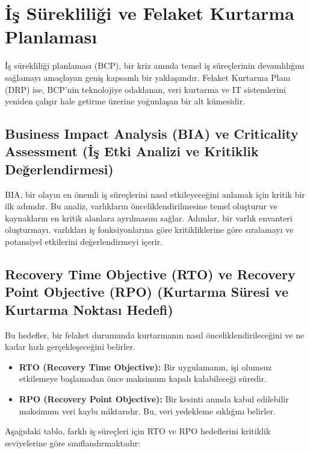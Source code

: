 \section{İş Sürekliliği ve Felaket Kurtarma Planlaması}

İş sürekliliği planlaması (BCP), bir kriz anında temel iş süreçlerinin devamlılığını sağlamayı amaçlayan geniş kapsamlı bir yaklaşımdır. Felaket Kurtarma Planı (DRP) ise, BCP'nin teknolojiye odaklanan, veri kurtarma ve IT sistemlerini yeniden çalışır hale getirme üzerine yoğunlaşan bir alt kümesidir.

\subsection{Business Impact Analysis (BIA) ve Criticality Assessment (İş Etki Analizi ve Kritiklik Değerlendirmesi)}

BIA, bir olayın en önemli iş süreçlerini nasıl etkileyeceğini anlamak için kritik bir ilk adımdır. Bu analiz, varlıkların önceliklendirilmesine temel oluşturur ve kaynakların en kritik alanlara ayrılmasını sağlar. Adımlar, bir varlık envanteri oluşturmayı, varlıkları iş fonksiyonlarına göre kritikliklerine göre sıralamayı ve potansiyel etkilerini değerlendirmeyi içerir.

\subsection{Recovery Time Objective (RTO) ve Recovery Point Objective (RPO) (Kurtarma Süresi ve Kurtarma Noktası Hedefi)}

Bu hedefler, bir felaket durumunda kurtarmanın nasıl önceliklendirileceğini ve ne kadar hızlı gerçekleşeceğini belirler.
\begin{itemize}
    \item \textbf{RTO (Recovery Time Objective):} Bir uygulamanın, işi olumsuz etkilemeye başlamadan önce maksimum kapalı kalabileceği süredir.
    \item \textbf{RPO (Recovery Point Objective):} Bir kesinti anında kabul edilebilir maksimum veri kaybı miktarıdır. Bu, veri yedekleme sıklığını belirler.
\end{itemize}

Aşağıdaki tablo, farklı iş süreçleri için RTO ve RPO hedeflerini kritiklik seviyelerine göre sınıflandırmaktadır:

